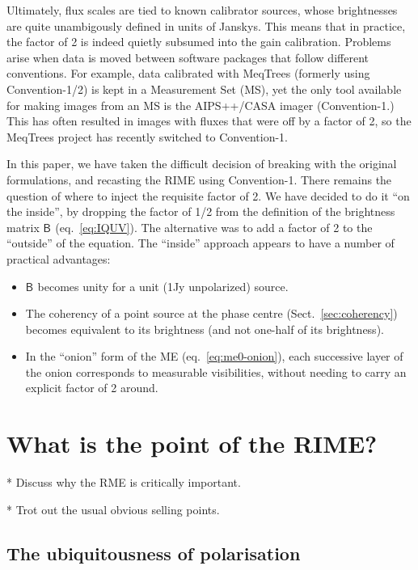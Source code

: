 \documentclass[]{aa}
\newcommand{\coh}[2]{\mathsf{{#1}}_{{#2}}}
\begin{document}
Ultimately, flux scales are tied to known calibrator sources, whose brightnesses are quite unambigously defined in units of Janskys. This means that in practice, the factor of 2 is indeed quietly subsumed into the gain calibration. Problems arise when data is moved between software packages that follow different conventions. For example, data calibrated with MeqTrees (formerly using 
Convention-1/2) is kept in a Measurement Set (MS), yet the only tool available for making images from an MS is the AIPS++/CASA imager (Convention-1.) This has often resulted in images with fluxes that were off by a factor of 2, so the MeqTrees project has recently switched to Convention-1.

In this paper, we have taken the difficult decision of breaking with the original formulations, and recasting the RIME using Convention-1. There remains the question of where to inject the requisite factor of 2. We have decided to do it ``on the inside'', by dropping the factor of 1/2 from the \citet{ME4} definition of the brightness matrix $\coh{B}{}$ (eq.~\ref{eq:IQUV}). The alternative was to add a factor of 2 to the ``outside'' of the equation. The ``inside'' approach appears to have a number of practical advantages:

\begin{itemize}
\item $\coh{B}{}$ becomes unity for a unit (1Jy unpolarized) source.
\item The coherency of a point source at the phase centre (Sect.~\ref{sec:coherency}) becomes equivalent to its brightness (and not one-half of its brightness).
\item In the ``onion'' form of the ME (eq.~\ref{eq:me0-onion}), each successive layer of the onion corresponds to measurable visibilities, without needing to carry an explicit factor of 2 around.
\end{itemize}

\section{\label{sec:what-is-the-point}What is the point of the RIME?}

* Discuss why the RME is critically important. 

* Trot out the usual obvious selling points.

\subsection{The ubiquitousness of polarisation}
\end{document}
